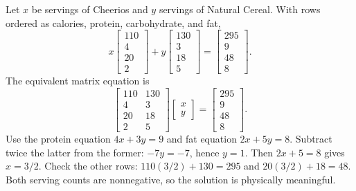 Let $x$ be servings of Cheerios and $y$ servings of Natural Cereal.
With rows ordered as calories, protein, carbohydrate, and fat,
\[
 x\begin{bmatrix}110\\4\\20\\2\end{bmatrix}
 +y\begin{bmatrix}130\\3\\18\\5\end{bmatrix}
 =\begin{bmatrix}295\\9\\48\\8\end{bmatrix}.
\]
The equivalent matrix equation is
\[
 \begin{bmatrix}110&130\\4&3\\20&18\\2&5\end{bmatrix}
 \begin{bmatrix}x\\y\end{bmatrix}
 =\begin{bmatrix}295\\9\\48\\8\end{bmatrix}.
\]
Use the protein equation $4x+3y=9$ and fat equation $2x+5y=8$.
Subtract twice the latter from the former: $-7y=-7$, hence $y=1$.
Then $2x+5=8$ gives $x=3/2$. Check the other rows:
$110(3/2)+130=295$ and $20(3/2)+18=48$. Both serving
counts are nonnegative, so the solution is physically meaningful.

